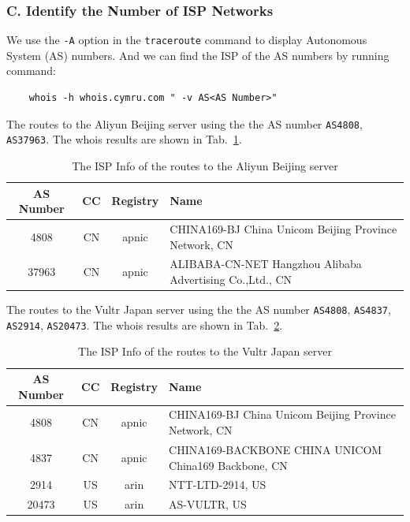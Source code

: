 \documentclass{cshwk}
\begin{document}
\subsubsection*{C. Identify the Number of ISP Networks}
We use the \texttt{-A} option in the \texttt{traceroute} command to display Autonomous System (AS) numbers. And we can find the ISP of the AS numbers by running command:
\begin{verbatim}
    whois -h whois.cymru.com " -v AS<AS Number>"
\end{verbatim}
The routes to the Aliyun Beijing server using the the AS number \texttt{AS4808}, \texttt{AS37963}. The whois results are shown in Tab.~\ref{tab:AS_result_aliyun}.
\begin{table}[H]
    \centering
    \begin{tabular}{cccp{3in}}
        \hline
        AS Number & CC & Registry & Name                                                     \\
        \hline
        4808      & CN & apnic    & CHINA169-BJ China Unicom Beijing Province Network, CN    \\
        37963     & CN & apnic    & ALIBABA-CN-NET Hangzhou Alibaba Advertising Co.,Ltd., CN \\
        \hline
    \end{tabular}
    \caption{The ISP Info of the routes to the Aliyun Beijing server}
    \label{tab:AS_result_aliyun}
\end{table}

The routes to the Vultr Japan server using the the AS number \texttt{AS4808}, \texttt{AS4837}, \texttt{AS2914}, \texttt{AS20473}. The whois results are shown in Tab.~\ref{tab:AS_result_vultr}.
\begin{table}[H]
    \centering
    \begin{tabular}{cccp{3in}}
        \hline
        AS Number & CC & Registry & Name                                                  \\
        \hline
        4808      & CN & apnic    & CHINA169-BJ China Unicom Beijing Province Network, CN \\
        4837      & CN & apnic    & CHINA169-BACKBONE CHINA UNICOM China169 Backbone, CN  \\
        2914      & US & arin     & NTT-LTD-2914, US                                      \\
        20473     & US & arin     & AS-VULTR, US                                          \\
        \hline
    \end{tabular}
    \caption{The ISP Info of the routes to the Vultr Japan server}
    \label{tab:AS_result_vultr}
\end{table}
\end{document}
